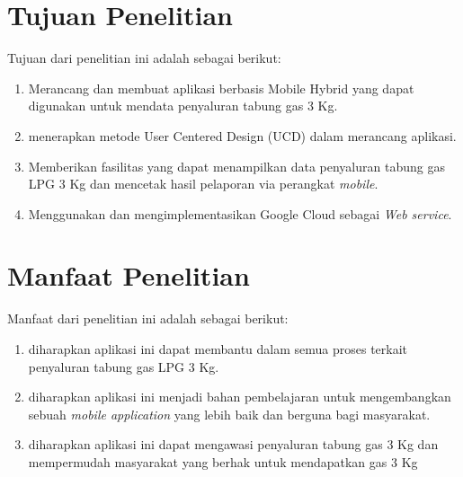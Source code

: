 \section{Tujuan Penelitian}
Tujuan dari penelitian ini adalah sebagai berikut:
\begin{enumerate}
	\item Merancang dan membuat aplikasi berbasis Mobile Hybrid yang dapat digunakan untuk mendata penyaluran tabung gas 3 Kg.
	\item menerapkan metode User Centered Design (UCD) dalam merancang aplikasi. 
	\item Memberikan fasilitas yang dapat menampilkan data penyaluran tabung gas LPG 3 Kg dan mencetak hasil pelaporan via perangkat \textit{mobile}.
	\item Menggunakan dan mengimplementasikan Google Cloud sebagai \textit{Web
		service}.
\end{enumerate}


\section{Manfaat Penelitian}
Manfaat dari penelitian ini adalah sebagai berikut:
\begin{enumerate}
	\item diharapkan aplikasi ini dapat membantu dalam semua proses terkait penyaluran tabung gas LPG 3 Kg.
	\item diharapkan aplikasi ini menjadi bahan pembelajaran untuk mengembangkan sebuah \textit{mobile application} yang lebih baik dan berguna bagi masyarakat.
	\item diharapkan aplikasi ini dapat mengawasi penyaluran tabung gas 3 Kg dan mempermudah masyarakat yang berhak untuk mendapatkan gas 3 Kg
\end{enumerate}


\begin{comment}

\end{comment}

